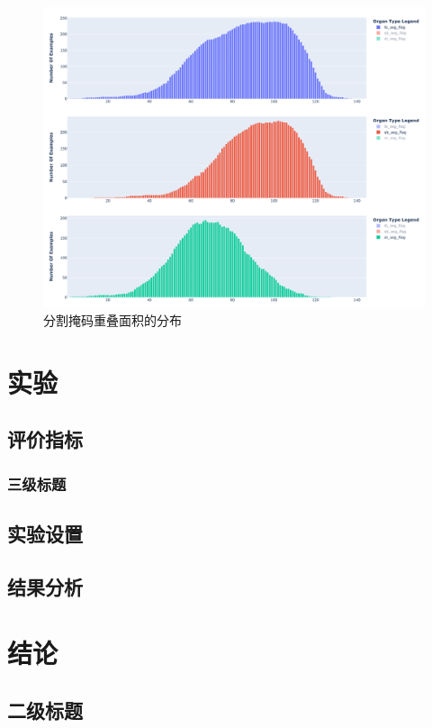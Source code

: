 \documentclass[letterpaper, 10pt, conference, twoside]{ieeeconf}
\begin{document}
\begin{figure}[htbp]
  \centering
  \includegraphics[width = 1\linewidth]{seg_distribution.png}
  \caption{分割掩码重叠面积的分布}
  \label{fig:fig7}
\end{figure}

\section{实验}
\subsection{评价指标}
\subsubsection{三级标题}

\subsection{实验设置}

\subsection{结果分析}

\section{结论}
\subsection{二级标题}
\end{document}
